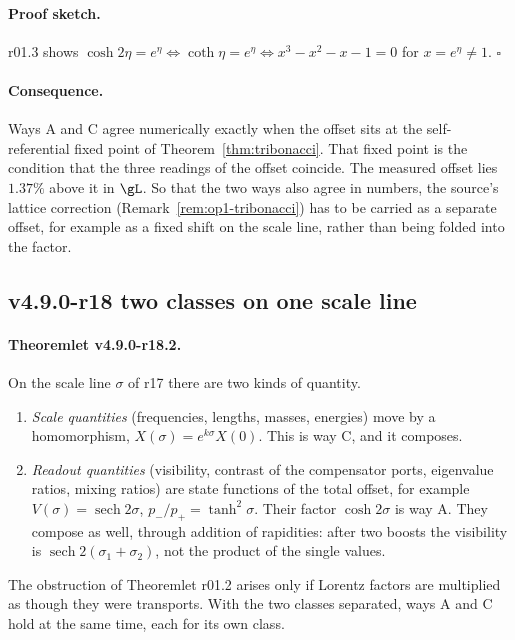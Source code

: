 \paragraph{Proof sketch.}
r01.3 shows \(\cosh2\eta=e^\eta\Leftrightarrow\coth\eta=e^\eta\Leftrightarrow x^3-x^2-x-1=0\) for \(x=e^\eta\neq1\).  \(\square\)

\paragraph{Consequence.}
Ways A and C agree numerically exactly when the offset sits at the self-referential fixed point of
Theorem~\ref{thm:tribonacci}.  That fixed point is the condition that the three readings of the offset coincide.  The measured
offset lies \(1.37\%\) above it in \(\gL\).  So that the two ways also agree in numbers, the source's lattice correction
(Remark~\ref{rem:op1-tribonacci}) has to be carried as a separate offset, for example as a fixed shift on the scale line,
rather than being folded into the factor.

\subsection*{v4.9.0-r18 two classes on one scale line}
\label{subsec:v490-r18-two-classes}

\paragraph{Theoremlet v4.9.0-r18.2.}
On the scale line \(\sigma\) of r17 there are two kinds of quantity.
\begin{enumerate}[leftmargin=2em]
\item[(a)] \emph{Scale quantities} (frequencies, lengths, masses, energies) move by a homomorphism, \(X(\sigma)=e^{k\sigma}X(0)\).
This is way C, and it composes.
\item[(b)] \emph{Readout quantities} (visibility, contrast of the compensator ports, eigenvalue ratios, mixing ratios) are state
functions of the total offset, for example \(V(\sigma)=\operatorname{sech}2\sigma\), \(p_-/p_+=\tanh^2\sigma\).  Their factor
\(\cosh2\sigma\) is way A.  They compose as well, through addition of rapidities: after two boosts the visibility is
\(\operatorname{sech}2(\sigma_1+\sigma_2)\), not the product of the single values.
\end{enumerate}
The obstruction of Theoremlet r01.2 arises only if Lorentz factors are multiplied as though they were transports.  With the
two classes separated, ways A and C hold at the same time, each for its own class.

